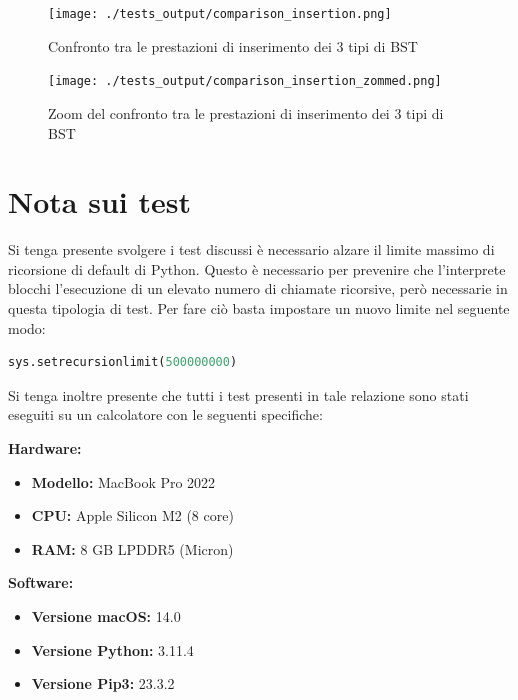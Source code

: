 \documentclass{article}
\begin{document}
\begin{figure}[htbp]
 \begin{minipage}{0.5\textwidth}
    \centering
    \texttt{[image: ./tests\_output/comparison\_insertion.png]}
    \caption{Confronto tra le prestazioni di inserimento dei 3 tipi di BST}
    \label{fig:comparison_insertion}
  \end{minipage}
      \hspace{0.05\textwidth}
  \begin{minipage}{0.5\textwidth}
    \centering
    \texttt{[image: ./tests\_output/comparison\_insertion\_zommed.png]}
    \caption{Zoom del confronto tra le prestazioni di inserimento dei 3 tipi di BST}
    \label{fig:comparison_insertion_zommed}
  \end{minipage}%
\end{figure}



\newpage

\section*{Nota sui test}

Si tenga presente svolgere i test discussi è necessario alzare il limite massimo di ricorsione di default di Python. Questo è necessario per prevenire che l'interprete blocchi l'esecuzione di un elevato numero di chiamate ricorsive, però necessarie in questa tipologia di test.
Per fare ciò basta impostare un nuovo limite nel seguente modo:
\begin{lstlisting}[language=Python]
sys.setrecursionlimit(500000000)
\end{lstlisting}


\vspace{20pt}


Si tenga inoltre presente che tutti i test presenti in tale relazione sono stati eseguiti su un calcolatore con le seguenti specifiche:

\begin{multicols}{2}
    \textbf{Hardware:}
    \begin{itemize}
        \item \textbf{Modello:} MacBook Pro 2022
        \item \textbf{CPU:} Apple Silicon M2 (8 core)
        \item \textbf{RAM:} 8 GB LPDDR5 (Micron)
    \end{itemize}
    
    \columnbreak
    
    \textbf{Software:}
    \begin{itemize}
        \item \textbf{Versione macOS:} 14.0
        \item \textbf{Versione Python:} 3.11.4
        \item \textbf{Versione Pip3:} 23.3.2
    \end{itemize}
\end{multicols}

\vspace{20pt}

\printbibliography[heading=bibintoc, title={Bibliografia}]  
\end{document}
